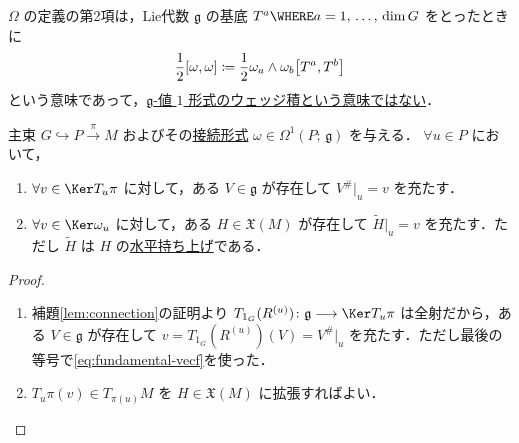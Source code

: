 \documentclass[TQFT_main]{subfiles}
\begin{document}
\begin{marker}
    $\Omega$ の定義の第2項は，Lie代数 $\mathfrak{g}$ の基底 $T^a \WHERE a = 1,\, \dots,\, \dim G$ をとったときに
    \begin{align}
        \frac{1}{2} \comm{\omega}{\omega} \coloneqq \frac{1}{2} \omega_a \wedge \omega_b \comm{T^a}{T^b}
    \end{align}
    という意味であって，\underline{$\mathfrak{g}$-値 $1$ 形式のウェッジ積という意味ではない}．
\end{marker}

\begin{mylem}[label=lem:extend-horizontal]{}
    主束 $G \hookrightarrow P \xrightarrow{\pi} M$ およびその\hyperref[def:connection]{接続形式} $\omega \in \Omega^1(P;\, \mathfrak{g})$ を与える．
    $\forall u \in P$ において，
    \begin{enumerate}
        \item $\forall v \in \Ker T_u \pi$ に対して，ある $V \in \mathfrak{g}$ が存在して $V^\#|_u = v$ を充たす．
        \item $\forall v \in \Ker \omega_u$ に対して，ある $H \in \mathfrak{X}(M)$ が存在して $\tilde{H}|_u = v$ を充たす．ただし $\tilde{H}$ は $H$ の\hyperref[def:horizontal-lift-vecf]{水平持ち上げ}である．
    \end{enumerate}
    
\end{mylem}

\begin{proof}
    \begin{enumerate}
        \item 補題\ref{lem:connection}の証明より $T_{1_G} (R^{(u)}) \colon \mathfrak{g} \lto \Ker T_u \pi$ は全射だから，ある $V \in \mathfrak{g}$ が存在して $v = T_{1_G} (R^{(u)}) (V) = V^\#|_u$ を充たす．ただし最後の等号で\eqref{eq:fundamental-vecf}を使った．
        \item $T_u \pi (v) \in T_{\pi(u)} M$ を $H \in \mathfrak{X}(M)$ に拡張すればよい．
    \end{enumerate}
\end{proof}
\end{document}
